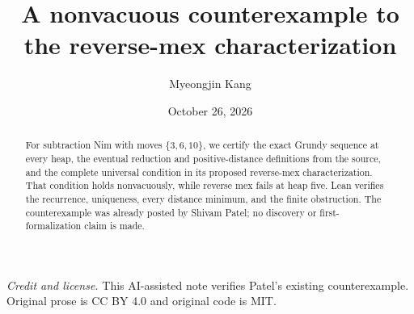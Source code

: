 \documentclass[11pt]{article}
\title{A nonvacuous counterexample to the reverse-mex characterization}
\author{Myeongjin Kang}
\date{October 26, 2026}
\begin{document}
\maketitle
\begin{abstract}
For subtraction Nim with moves $\{3,6,10\}$, we certify the exact Grundy sequence at every heap, the eventual reduction and positive-distance definitions from the source, and the complete universal condition in its proposed reverse-mex characterization. That condition holds nonvacuously, while reverse mex fails at heap five. Lean verifies the recurrence, uniqueness, every distance minimum, and the finite obstruction. The counterexample was already posted by Shivam Patel; no discovery or first-formalization claim is made.
\end{abstract}
\noindent\textit{Credit and license.} This AI-assisted note verifies Patel's existing counterexample. Original prose is CC BY 4.0 and original code is MIT.
\end{document}
